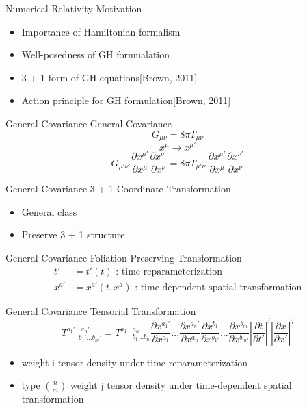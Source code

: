 \documentclass[xcolor=dvipsnames]{beamer}
\begin{document}
	\begin{frame}{Numerical Relativity}
		Motivation
		\begin{itemize}
			\item{Importance of Hamiltonian formalism}
			\item{Well-posedness of GH formualation}
			\pause
			\item{3 + 1 form of GH equations[Brown, 2011]}
			\item{Action principle for GH formulation[Brown, 2011]}
		\end{itemize}
	\end{frame}
	\begin{frame}{General Covariance}
		General Covariance
		\pause
		\Large
		\[
		G_{\mu\nu} = 8\pi T_{\mu\nu}
		\]
		\pause
		\[
		x^{\mu} \rightarrow x^{\mu'}
		\]
		\pause
		\[
		G_{\mu'\nu'}\frac{\partial x^{\mu'}}{\partial x^{\mu}}\frac{\partial x^{\nu'}}{\partial x^{\nu}} = 8 \pi T_{\mu'\nu'}\frac{\partial x^{\mu'}}{\partial x^{\mu}}\frac{\partial x^{\nu'}}{\partial x^{\nu}}
		\]
	\end{frame}
	\begin{frame}{General Covariance}
		3 + 1 Coordinate Transformation
		\begin{itemize}
			\item{General class}
			\item{Preserve 3 + 1 structure}
		\end{itemize}
	\end{frame}
	\begin{frame}{General Covariance}
		Foliation Preserving Transformation
		\pause
		\begin{align*}
		t' &= t'(t)\text{  : time reparameterization}\\
		x^{a'} &= x^{a'}(t, x^{a})\text{  : time-dependent spatial transformation}
	\end{align*}
	\end{frame}
	\begin{frame}{General Covariance}
		Tensorial Transformation
		\[
		T^{a_{1}'...a_{n}'}_{~~~~~~~~b_{1}'...b_{m}'} = T^{a_{1}...a_{n}}_{~~~~~~~~b_{1}...b_{n}}\frac{\partial x^{a_{1}'}}{\partial x^{a_{1}}}...\frac{\partial x^{a_{n}'}}{\partial x^{a_{n}}}\frac{\partial x^{b_{1}}}{\partial x^{b_{1'}}}...\frac{\partial x^{b_{m}}}{\partial x^{b_{m'}}}\left|\frac{\partial t}{\partial t'}\right|^{i}\left|\frac{\partial x}{\partial x'}\right|^{j} 
		\]
		\pause
		\begin{itemize}
			\item{weight i tensor density under time reparameterization}
			\item{type $n\choose m$ weight j tensor density under time-dependent spatial transformation}
		\end{itemize}
	\end{frame}
\end{document}
